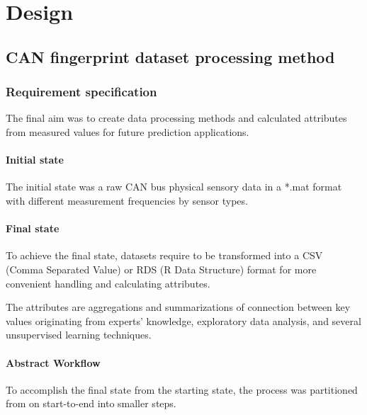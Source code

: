 \chapter{Design}
\section{CAN fingerprint dataset processing method}
\subsection{Requirement specification}
	\noindent
The final aim was to create data processing methods and calculated attributes from measured values for future prediction applications.
	\subsubsection{Initial state}
The initial state was a raw CAN bus physical sensory data in a *.mat format with different measurement frequencies by sensor types.
	\subsubsection{Final state}
To achieve the final state, datasets require to be transformed into a CSV (Comma Separated Value) or RDS (R Data Structure) format for more convenient handling and calculating attributes.

The attributes are aggregations and summarizations of connection between key values originating from experts' knowledge, exploratory data analysis, and several unsupervised learning techniques.
\subsubsection{Abstract Workflow}
To accomplish the final state from the starting state, the process was partitioned from on start-to-end into smaller steps. 

